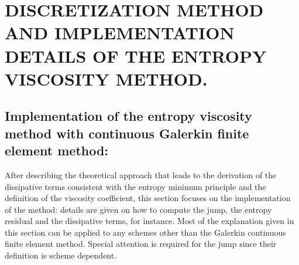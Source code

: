 %
%
%


\pagestyle{plain} %
\setcounter{page}{1}

\chapter{\uppercase {Discretization method and implementation details of the entropy viscosity method.}}
\section{Implementation of the entropy viscosity method with continuous Galerkin finite element method:}
After describing the theoretical approach that leads to the derivation of the dissipative terms consistent with the entropy minimum principle and the definition of the viscosity coefficient, this section focuses on the implementation of the method: details are given on how to compute the jump, the entropy residual and the dissipative terms, for instance. Most of the explanation given in this section can be applied to any schemes other than the Galerkin continuous finite element method. Special attention is required for the jump since their definition is scheme dependent. \\

